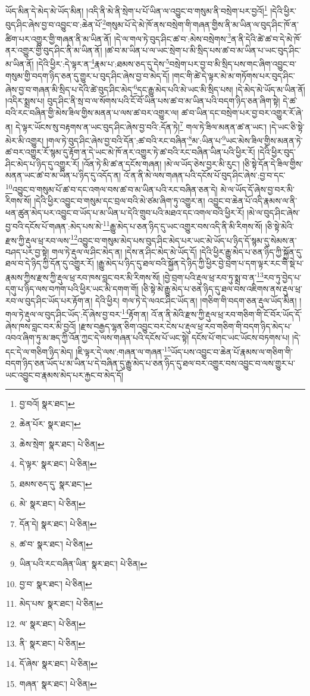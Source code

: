 ཡོད་མིན་དེ་མེད་མེ་ཡོད་མིན། །འདི་ནི་མེ་ནི་སྲེག་པ་པོ་ཡིན་ལ་འབྱུང་བ་གསུམ་ནི་བསྲེག་པར་བྱའོ།\footnote{བྱ་བའོ།  སྣར་ཐང་། } །དེའི་ཕྱིར་བུད་ཤིང་ཞེས་བྱ་བ་འབྱུང་བ་:ཆེན་པོ་\footnote{ཆེན་པོར་  སྣར་ཐང་། }གསུམ་པོ་དེ་མེ་ཁོ་ནས་བསྲེག་གི་གཞན་གྱིས་ནི་མ་ཡིན་ལ་བུད་ཤིང་ཁོ་ན་ཚིག་པར་འགྱུར་གྱི་གཞན་ནི་མ་ཡིན་ནོ། །དེ་ལ་གལ་ཏེ་བུད་ཤིང་ཚ་བ་:མེས་བསྲེགས་\footnote{ཆེས་སྲེག་  སྣར་ཐང་།  པེ་ཅིན། }ན་ནི་དེའི་ཚེ་ཚ་བ་དེ་མེ་ཁོ་ནར་འགྱུར་གྱི་བུད་ཤིང་ནི་མ་ཡིན་ནོ། །ཚ་བ་མ་ཡིན་པ་ལ་ཡང་སྲེག་པ་མི་སྲིད་པས་ཚ་བ་མ་ཡིན་པ་ཡང་བུད་ཤིང་མ་ཡིན་ནོ། །དེའི་ཕྱིར་:དེ་ལྟར་ན་\footnote{དེ་ལྟར་  སྣར་ཐང་།  པེ་ཅིན། }རྣམ་པ་:ཐམས་ཅད་དུ་དེས་\footnote{ཐམས་ཅད་དུ་  སྣར་ཐང་། }བསྲེག་པར་བྱ་བ་མི་སྲིད་པས་གང་ཞིག་འབྱུང་བ་གསུམ་གྱི་བདག་ཉིད་ཅན་དུ་གྱུར་པ་བུད་ཤིང་ཞེས་བྱ་བ་མེད་དོ། །གང་གི་ཚེ་དེ་ལྟར་མེ་མ་གཏོགས་པར་བུད་ཤིང་ཞེས་བྱ་བ་གཞན་མི་སྲིད་པ་དེའི་ཚེ་བུད་ཤིང་མེད་\footnote{མེ་  སྣར་ཐང་།  པེ་ཅིན། }དང་རྒྱུ་མེད་པའི་མེ་ཡང་མི་སྲིད་པས། །དེ་མེད་མེ་ཡོད་མ་ཡིན་ནོ། །འདིར་སྨྲས་པ། བུད་ཤིང་ནི་སྲ་བ་ལ་སོགས་པའི་ངོ་བོ་ཡིན་པས་ཚ་བ་མ་ཡིན་པའི་བདག་ཉིད་ཅན་ཞིག་སྟེ། དེ་ཚ་བའི་རང་བཞིན་གྱི་མེས་ཟིལ་གྱིས་མནན་པ་ལས་ཚ་བར་འགྱུར་ལ། ཚ་བ་ཡིན་དང་བསྲེག་པར་བྱ་བར་འགྱུར་རོ་ཞེ་ན། དེ་ལྟར་ཡོངས་སུ་བརྟགས་ན་ཡང་བུད་ཤིང་ཞེས་བྱ་བའི་:དོན་ཏེ།\footnote{དོན་དེ།  སྣར་ཐང་།  པེ་ཅིན། } གལ་ཏེ་ཟིལ་མནན་ཚ་ན་ཡང་། །དེ་ཡང་ཅི་སྟེ་མེར་མི་འགྱུར། །གལ་ཏེ་བུད་ཤིང་ཞེས་བྱ་བའི་དོན་:ཚ་བའི་རང་བཞིན་\footnote{ཚ་བ་  སྣར་ཐང་།  པེ་ཅིན། }མ་:ཡིན་པ་\footnote{ཡིན་པའི་རང་བཞིན་ཡིན་  སྣར་ཐང་།  པེ་ཅིན། }ཡང་མེས་ཟིལ་གྱིས་མནན་ཏེ་ཚ་བར་འགྱུར་རོ་སྙམ་དུ་རྟོག་ན་དེ་ཡང་མེ་ཁོ་ནར་འགྱུར་ཏེ་ཚ་བའི་རང་བཞིན་ཡིན་པའི་ཕྱིར་རོ། །དེའི་ཕྱིར་བུད་ཤིང་མེད་པ་ཉིད་དུ་འགྱུར་རོ། །འོན་ཏེ་མི་ཚ་ན་དངོས་གཞན། །མེ་ལ་ཡོད་ཅེས་བྱར་མི་རུང་། །ཅི་སྟེ་དོན་དེ་ཟིལ་གྱིས་མནན་ཡང་ཚ་བ་མ་ཡིན་པ་ཉིད་དུ་འདོད་ན། འོ་ན་ནི་མེ་ལས་གཞན་པའི་དངོས་པོ་བུད་ཤིང་ཞེས་:བྱ་བ་དང་\footnote{བྱ་བ་  སྣར་ཐང་།  པེ་ཅིན། }འབྱུང་བ་གསུམ་པོ་ཚ་བ་དང་འགལ་བས་ཚ་བ་མ་ཡིན་པའི་རང་བཞིན་ཅན་དེ། མེ་ལ་ཡོད་དོ་ཞེས་བྱ་བར་མི་རིགས་སོ། །དེའི་ཕྱིར་འབྱུང་བ་གསུམ་དང་བྲལ་བའི་མེ་ཙམ་ཞིག་ཏུ་འགྱུར་ན། འབྱུང་བ་ཆེན་པོ་འདི་རྣམས་ལ་ནི་ཕན་ཚུན་མེད་པར་འབྱུང་བ་ཡོད་པ་མ་ཡིན་པ་དེའི་གྲུབ་པའི་མཐའ་དང་འགལ་བའི་ཕྱིར་རོ། །མེ་ལ་བུད་ཤིང་ཞེས་བྱ་བའི་དངོས་པོ་གཞན་:མེད་པས་མེ་\footnote{མེད་པས་  སྣར་ཐང་།  པེ་ཅིན། }རྒྱུ་མེད་པ་ཅན་ཉིད་དུ་ཡང་འགྱུར་བས་འདི་ནི་མི་རིགས་སོ། །ཅི་སྟེ་མེའི་རྫས་ཀྱི་རྡུལ་ཕྲ་རབ་ལས་\footnote{ལ་  སྣར་ཐང་།  པེ་ཅིན། }འབྱུང་བ་གསུམ་མེད་པས་བུད་ཤིང་མེད་པར་ཡང་མེ་ཡོད་པ་ཉིད་དོ་སྙམ་དུ་སེམས་ན་བཤད་པར་བྱ་སྟེ། གལ་ཏེ་རྡུལ་ལ་ཤིང་མེད་ན། །དེས་ན་ཤིང་མེད་མེ་ཡོད་དོ། །དེའི་ཕྱིར་རྒྱུ་མེད་པ་ཅན་ཉིད་ཀྱི་སྐྱོན་དུ་ཐལ་བ་དེ་ཉིད་ཀྱི་དོན་དུ་འགྱུར་རོ། །རྒྱུ་མེད་པ་ཉིད་དུ་ཐལ་བའི་སྐྱོན་དེ་ཉིད་ཀྱི་ཕྱིར་བྱེ་བྲག་པ་དག་ལྟར་རང་གི་སྡེ་པ་རྣམས་ཀྱིས་རྫས་ཀྱི་རྡུལ་ཕྲ་རབ་ཁས་བླང་བར་མི་རིགས་སོ། །བྱེ་བྲག་པའི་རྡུལ་ཕྲ་རབ་ཏུ་སྨྲ་བ་ན་\footnote{ནི་  སྣར་ཐང་།  པེ་ཅིན། }རབ་ཏུ་བྱེད་པ་དགུ་པ་ཉིད་ལས་བཀག་པའི་ཕྱིར་ཡང་མི་དགག་གོ། །ཅི་སྟེ་མེ་རྒྱུ་མེད་པ་ཅན་ཉིད་དུ་ཐལ་བས་འཇིགས་ནས་རྡུལ་ཕྲ་རབ་ལ་བུད་ཤིང་ཡོད་པར་རྟོག་ན། དེའི་ཕྱིར། གལ་ཏེ་དེ་ལའང་ཤིང་ཡོད་ན། །གཅིག་གི་བདག་ཅན་རྡུལ་ཡོད་མིན། །གལ་ཏེ་རྡུལ་ལ་བུད་ཤིང་ཡོད་:དོ་ཞེས་བྱ་བར་\footnote{དོ་ཞེས་  སྣར་ཐང་།  པེ་ཅིན། }རྟོག་ན། འོ་ན་ནི་མེའི་རྫས་ཀྱི་རྡུལ་ཕྲ་རབ་གཅིག་གི་ངོ་བོར་ཡོད་དོ་ཞེས་ཁས་བླང་བར་མི་བྱའོ། །རྫས་བརྒྱད་ལྷན་ཅིག་འབྱུང་བར་ངེས་པ་རྡུལ་ཕྲ་རབ་གཅིག་གི་བདག་ཉིད་མེད་པ་འབའ་ཞིག་ཏུ་མ་ཟད་ཀྱི་འོན་ཀྱང་དེ་ལས་གཞན་པའི་དངོས་པོ་ཡང་སྟེ། དངོས་པོ་གང་ཡང་ཡོངས་བཏགས་པ། །དེ་དང་དེ་ལ་གཅིག་ཉིད་མེད། །ཇི་ལྟར་དེ་ལས་:གཞན་ལ་གཞན་\footnote{གཞན་  སྣར་ཐང་།  པེ་ཅིན། }ཡོད་པས་འབྱུང་བ་ཆེན་པོ་རྣམས་ལ་གཅིག་གི་བདག་ཉིད་ཅན་ཡོད་པ་མ་ཡིན་པ་དེ་བཞིན་དུ་རྒྱུ་མེད་པ་ཅན་ཉིད་དུ་ཐལ་བར་འགྱུར་བས་འབྱུང་བ་ལས་གྱུར་པ་ཡང་འབྱུང་བ་རྣམས་མེད་པར་རྐྱང་བ་མེད་དོ། 